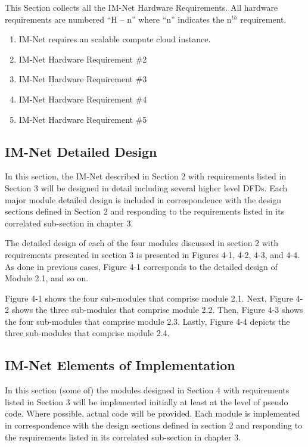 \documentclass[letterpaper]{article}
\begin{document}
{This Section collects all the IM-Net Hardware Requirements. All hardware requirements are numbered ``H -- n'' where ``n'' indicates the n${}^{th}$ requirement.

\begin{enumerate}
\item  IM-Net requires an scalable compute cloud instance.

\item  IM-Net Hardware Requirement \#2

\item  IM-Net Hardware Requirement \#3

\item  IM-Net Hardware Requirement \#4

\item  IM-Net Hardware Requirement \#5
\end{enumerate}

\eject

\textcolor{section}{\section{IM-Net Detailed Design}}

In this section, the IM-Net described in Section 2 with requirements listed in Section 3 will be designed in detail including several higher level DFDs. Each major module detailed design is included in correspondence with the design sections defined in Section 2 and responding to the requirements listed in its correlated sub-section in chapter 3.

The detailed design of each of the four modules discussed in section 2 with requirements presented in section 3 is presented in Figures 4-1, 4-2, 4-3, and 4-4. As done in previous cases, Figure 4-1 corresponds to the detailed design of Module 2.1, and so on.

Figure 4-1 shows the four sub-modules that comprise module 2.1. Next, Figure 4-2 shows the three sub-modules that comprise module 2.2. Then, Figure 4-3 shows the four sub-modules that comprise module 2.3. Lastly, Figure 4-4 depicts the three sub-modules that comprise module 2.4.

\eject 

 
\textcolor{section}{\section{IM-Net Elements of Implementation}}

In this section (some of) the modules designed in Section 4 with requirements listed in Section 3 will be implemented initially at least at the level of pseudo code. Where possible, actual code will be provided. Each module is implemented in correspondence with the design sections defined in section 2 and responding to the requirements listed in its correlated sub-section in chapter 3.

}
\end{document}
